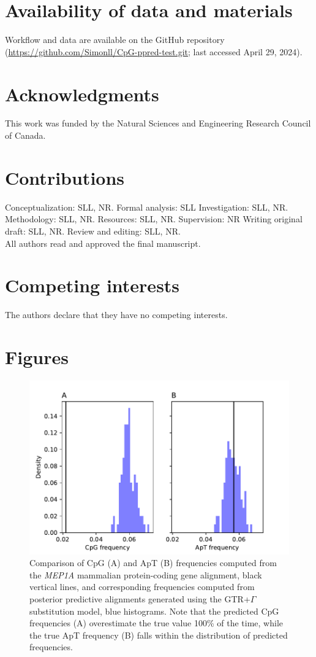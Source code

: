 \documentclass{article}
\begin{document}
\section*{Availability of data and materials}
Workflow and data are available on the GitHub repository (\url{https://github.com/Simonll/CpG-ppred-test.git}; last accessed April 29, 2024).

\section*{Acknowledgments}
This work was funded by the Natural Sciences and Engineering Research Council of Canada.

\section*{Contributions}
Conceptualization: SLL, NR. Formal analysis: SLL Investigation: SLL, NR. Methodology: SLL, NR. Resources: SLL, NR. Supervision: NR Writing original draft: SLL, NR. Review and editing: SLL, NR. \\
All authors read and approved the final manuscript.

\section*{Competing interests}
The authors declare that they have no competing interests.

\newpage
\section*{Figures}

\begin{figure}[H]
  \centering
  \includegraphics[width=\textwidth,height=\textheight,keepaspectratio]{figures/figure1.pdf}
  \caption{Comparison of CpG (A) and ApT (B) frequencies computed from the \emph{MEP1A} mammalian protein-coding gene alignment, black vertical lines, and corresponding frequencies computed from posterior predictive alignments generated using the GTR+$\Gamma$ substitution model, blue histograms. Note that the predicted CpG frequencies (A) overestimate the true value 100\% of the time, while the true ApT frequency (B) falls within the distribution of predicted frequencies.}
  \label{fig:figure_1}
\end{figure}
\end{document}
